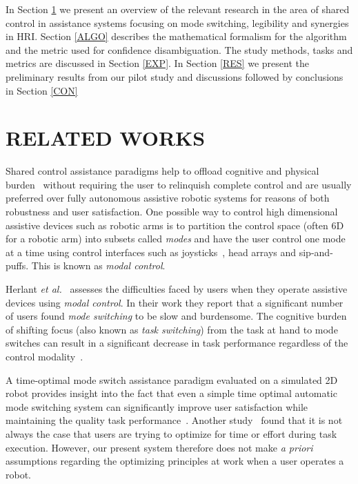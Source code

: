 \documentclass[conference]{IEEEtran}
\begin{document}
In Section \ref{RW} we present an overview of the relevant research in the area of shared control in assistance systems focusing on mode switching, legibility and synergies in HRI. Section \ref{ALGO} describes the mathematical formalism for the algorithm and the metric used for confidence disambiguation. The study methods, tasks and metrics are discussed in Section \ref{EXP}. In Section \ref{RES} we present the preliminary results from our pilot study and discussions followed by conclusions in Section \ref{CON}

\section{RELATED WORKS}\label{RW} 

Shared control assistance paradigms help to offload cognitive and physical burden~\cite{volosyak2005rehabilitation} without requiring the user to relinquish complete control and are usually preferred over fully autonomous assistive robotic systems for reasons of both robustness and user satisfaction. One possible way to control high dimensional assistive devices such as robotic arms is to partition the control space (often 6D for a robotic arm) into subsets called \textit{modes} and have the user control one mode at a time using control interfaces such as joysticks~\cite{tsui2008development}, head arrays and sip-and-puffs. This is known as \textit{modal control}.

Herlant \textit{et al.}~\cite{herlant2016assistive} assesses the difficulties faced by users when they operate assistive devices using \textit{modal control}. In their work they report that a significant number of users found \textit{mode switching} to be slow and burdensome. The cognitive burden of shifting focus (also known as \textit{task switching})  from the task at hand to mode switches can result in a significant decrease in task performance regardless of the control modality~\cite{monsell2003task}. 

 A time-optimal mode switch assistance paradigm evaluated on a simulated 2D robot provides insight into the fact that even a simple time optimal automatic mode switching system can significantly improve user satisfaction while maintaining the quality task performance~\cite{herlant2016assistive}.  Another study~\cite{gopinath2017human} found that it is not always the case that users are trying to optimize for time or effort during task execution. However, our present system therefore does not make \textit{a priori} assumptions regarding the optimizing principles at work when a user operates a robot.
\end{document}

